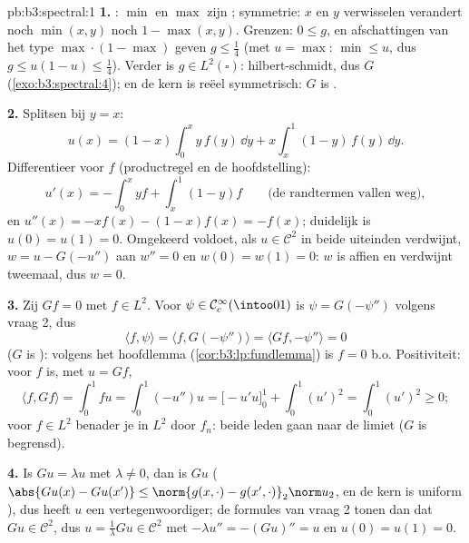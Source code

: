\begin{solution}{pb:b3:spectral:1}
\textbf{1.} : $\min$ en $\max$ zijn ;
symmetrie: $x$ en $y$ verwisselen verandert noch $\min(x,y)$ noch
$1 - \max(x,y)$. Grenzen: $0 \leq g$, en afschattingen van het
type $\max\cdot(1-\max)$ geven $g \leq \frac14$ (met $u = \max$:
$\min \leq u$, dus $g \leq u(1-u) \leq \frac14$). Verder is $g
\in L^2(\square)$: hilbert-schmidt, dus $G$ 
(\cref{exo:b3:spectral:4}); en de kern is reëel symmetrisch: $G$
is .

\textbf{2.} Splitsen bij $y = x$:
\[
u(x) = (1 - x)\int_0^x y\,f(y)\,\dd y +
x\int_x^1(1 - y)\,f(y)\,\dd y .
\]
Differentieer voor  $f$ (productregel en de
hoofdstelling):
\[
u'(x) = -\int_0^xyf + \int_x^1(1-y)f
\qquad\text{(de randtermen vallen weg)},
\]
en $u''(x) = -xf(x) - (1 - x)f(x) = -f(x)$; duidelijk is $u(0) =
u(1) = 0$. Omgekeerd voldoet, als $u \in \mathcal C^2$ in beide
uiteinden verdwijnt, $w = u - G(-u'')$ aan $w'' = 0$ en $w(0) =
w(1) = 0$: $w$ is affien en verdwijnt tweemaal, dus $w = 0$.

\textbf{3.} Zij $Gf = 0$ met $f \in L^2$. Voor $\psi \in \mathcal
C_c^\infty(\intoo01)$ is $\psi = G(-\psi'')$ volgens vraag 2,
dus
\[
\langle f, \psi\rangle = \langle f, G(-\psi'')\rangle
= \langle Gf, -\psi''\rangle = 0
\]
($G$ is ): volgens het hoofdlemma
(\cref{cor:b3:lp:fundlemma}) is $f = 0$ b.o. Positiviteit: voor
 $f$ is, met $u = Gf$,
\[
\langle f, Gf\rangle = \int_0^1 fu = \int_0^1(-u'')u
= \bigl[-u'u\bigr]_0^1 + \int_0^1(u')^2 = \int_0^1(u')^2
\geq 0 ;
\]
voor $f \in L^2$ benader je in $L^2$ door  $f_n$: beide
leden gaan naar de limiet ($G$ is begrensd).

\textbf{4.} Is $Gu = \lambda u$ met $\lambda \neq 0$, dan is $Gu$
 ($\abs{Gu(x) - Gu(x')} \leq \norm{g(x,\cdot) -
g(x',\cdot)}_2\norm u_2$, en de kern is uniform ), dus
heeft $u$ een  vertegenwoordiger; de formules van vraag 2
tonen dan dat $Gu \in \mathcal C^2$, dus $u = \frac1\lambda Gu
\in \mathcal C^2$ met $-\lambda u'' = -(Gu)'' = u$ en $u(0) =
u(1) = 0$.


\end{solution}
